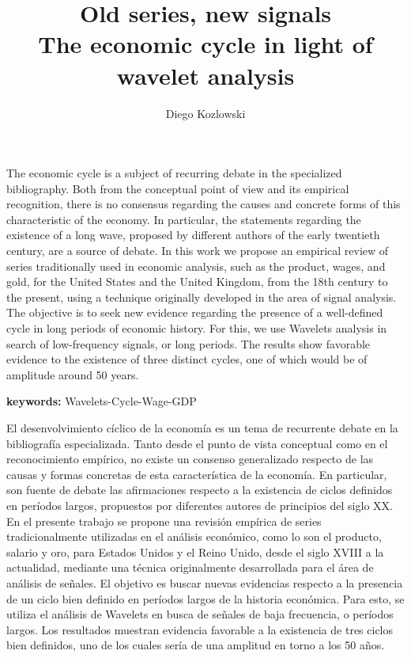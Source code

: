 \documentclass[a4paper,10cpi]{article}
\title{{\fontfamily{ptm}\selectfont \Large Old series, new signals \\
	  The economic cycle in light of wavelet analysis }}
\author[1]{Diego Kozlowski}
\affil[1]{Licenciado en Econom\'{i}a por la FCE-UBA. Maestrando \par
	en Data Mining \& Knowledge Discovery, FCEN-UBA \par
	Pabell\'{o}n I - Ciudad Universitaria, Buenos Aires, Argentina, cp: 1428 \par 
	dkozlowski@dc.uba.ar}
\date{}                     %
\renewenvironment{abstract}{
	\vspace*{\fill}
	\begin{center}%
		\bfseries\abstractname
\end{center}}%
{\vfill}
\begin{document}
	
	
	\maketitle
	
	
	
	\begin{abstract}
		The economic cycle is a subject of recurring debate in the specialized bibliography. Both from the conceptual point of view and its empirical recognition, there is no consensus regarding the causes and concrete forms of this characteristic of the economy. In particular, the statements regarding the existence of a long wave, proposed by different authors of the early twentieth century, are a source of debate. In this work we propose an empirical review of series traditionally used in economic analysis, such as the product, wages, and gold, for the United States and the United Kingdom, from the 18th century to the present, using a technique originally developed in the area of ​​signal analysis. The objective is to seek new evidence regarding the presence of a well-defined cycle in long periods of economic history. For this, we use Wavelets analysis in search of low-frequency signals, or long periods. The results show favorable evidence to the existence of three distinct cycles, one of which would be of amplitude around 50 years.
	\end{abstract}
	
	\textbf{keywords:} Wavelets-Cycle-Wage-GDP
	\medskip
	
	\pagebreak
	

	\justify
	
	\begin{abstract}
		El desenvolvimiento cíclico de la economía es un tema de recurrente debate en la bibliografía especializada. Tanto desde el punto de vista conceptual como en el reconocimiento empírico, no existe un consenso generalizado respecto de las causas y formas concretas de esta característica de la economía. En particular, son fuente de debate las afirmaciones respecto a la existencia de ciclos definidos en períodos largos, propuestos por diferentes autores de principios del siglo XX. En el presente trabajo se propone una revisión empírica de series tradicionalmente utilizadas en el análisis económico, como lo son el producto, salario y oro, para Estados Unidos y el Reino Unido, desde el siglo XVIII a la actualidad, mediante una técnica originalmente desarrollada para el área de análisis de señales. El objetivo es buscar nuevas evidencias respecto a la presencia de un ciclo bien definido en períodos largos de la historia económica. Para esto, se utiliza el análisis de Wavelets en busca de señales de baja frecuencia, o períodos largos. Los resultados muestran evidencia favorable a la existencia de tres ciclos bien definidos, uno de los cuales sería de una amplitud en torno a los 50 años.
	\end{abstract}
\end{document}
